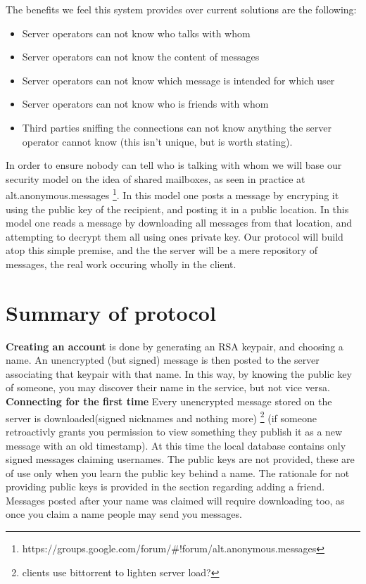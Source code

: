 The benefits we feel this system provides over current solutions are the
following:
\begin{itemize}
\item Server operators can not know who talks with whom
\item Server operators can not know the content of messages
\item Server operators can not know which message is intended for which user
\item Server operators can not know who is friends with whom
\item Third parties sniffing the connections can not know anything the server
operator cannot know (this isn't unique, but is worth stating).
\end{itemize}

In order to ensure nobody can tell who is talking with whom we will base our
security model on the idea of shared mailboxes, as seen in practice at
alt.anonymous.messages
\footnote{https://groups.google.com/forum/\#!forum/alt.anonymous.messages}.
In this model one posts a message by encryping it using the public key of the
recipient, and posting it in a public location. In this model one reads a
message by downloading all messages from that location, and attempting to
decrypt them all using ones private key. Our protocol will build atop this
simple premise, and the the server will be a mere repository of messages, the
real work occuring wholly in the client.

\chapter{Summary of protocol} 
\textbf{Creating an account} is done by generating an RSA keypair, and choosing
a name. An unencrypted (but signed) message is then posted to the server
associating that keypair with that name. In this way, by knowing the public key
of someone, you may discover their name in the service, but not vice versa.\\

\textbf{Connecting for the first time} Every unencrypted message stored on the
server is downloaded(signed nicknames and nothing more) \footnote{clients use
bittorrent to lighten server load?} (if someone retroactivly grants you
permission to view something they publish it as a new message with an old
timestamp). At this time the local database contains only signed messages
claiming usernames. The public keys are not provided, these are of use only when
you learn the public key behind a name. The rationale for not providing public
keys is provided in the section regarding adding a friend. Messages posted
after your name was claimed will require downloading too, as once you claim a
name people may send you messages.\\

